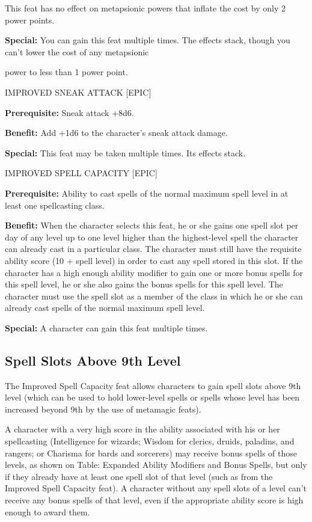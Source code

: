\documentclass{article}
\begin{document}
This feat has no effect on metapsionic powers that inflate the cost by only 2 power 
points.

\textbf{Special:} You can gain this feat multiple times. The effects stack, though 
you can't lower the cost of any metapsionic

power to less than 1 power point.

\vspace{12pt}
IMPROVED SNEAK ATTACK [EPIC] 

\textbf{Prerequisite:} Sneak attack +8d6. 

\textbf{Benefit:} Add +1d6 to the character's sneak attack damage. 

\textbf{Special:} This feat may be taken multiple times. Its effects stack. 

\vspace{12pt}
IMPROVED SPELL CAPACITY [EPIC] 

\textbf{Prerequisite:} Ability to cast spells of the normal maximum spell level 
in at least one spellcasting class. 

\textbf{Benefit:} When the character selects this feat, he or she gains one spell 
slot per day of any level up to one level higher than the highest-level spell the 
character can already cast in a particular class. The character must still have 
the requisite ability score (10 + spell level) in order to cast any spell stored 
in this slot. If the character has a high enough ability modifier to gain one or 
more bonus spells for this spell level, he or she also gains the bonus spells for 
this spell level. The character must use the spell slot as a member of the class 
in which he or she can already cast spells of the normal maximum spell level.

\textbf{Special:} A character can gain this feat multiple times.

\vspace{12pt}
\subsection*{\textbf{Spell Slots Above 9th Level }}

\baselineskip=12pt
The Improved Spell Capacity feat allows characters to gain spell slots above 9th 
level (which can be used to hold lower-level spells or spells whose level has been 
increased beyond 9th by the use of metamagic feats).

A character with a very high score in the ability associated with his or her spellcasting 
(Intelligence for wizards; Wisdom for clerics, druids, paladins, and rangers; or 
Charisma for bards and sorcerers) may receive bonus spells of those levels, as 
shown on Table: Expanded Ability Modifiers and Bonus Spells, but only if they already 
have at least one spell slot of that level (such as from the Improved Spell Capacity 
feat). A character without any spell slots of a level can't receive any bonus spells 
of that level, even if the appropriate ability score is high enough to award them.
\end{document}
